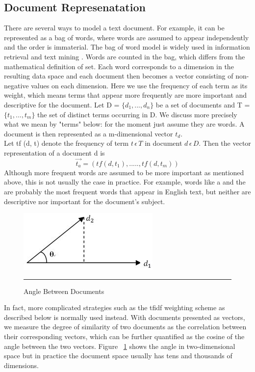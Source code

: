 \subsection{Document Represenatation}
There are several ways to model a text document. For example, it can be represented as a bag of words, where words are assumed to appear independently and the order is immaterial. The bag of word model is widely used in information retrieval and text mining . Words are counted in the bag, which differs from the mathematical definition of set. Each word corresponds to a dimension in the resulting data space and each document then becomes a  vector consisting of non-negative values on each dimension. Here we use the frequency of each term as its weight, which means terms that appear more frequently are more important and descriptive for the document.
Let D = $\{d_1 , . . . , d_n \}$ be a set of documents and T = $\{t_1 , . . . ,t_m \}$ the set of distinct terms occurring in D. We discuss more precisely what we mean by "terms" below: for the moment just assume they are words. A document is then represented as a m-dimensional vector $t_d$.\\
Let tf (d, t) denote the frequency of term $t \,\epsilon\, T$ in document $d \, \epsilon\, D$. Then the vector representation of a document d is
\begin{equation}
\vec{t_{a}} = (tf(d,t_1),.....,tf(d,t_m))
\end{equation}
Although more frequent words are assumed to be more important as mentioned above, this is not usually the case in practice. For example, words like a and the are probably the most frequent words that appear in English text, but neither are descriptive nor important for the document’s subject.
\begin{figure}[htbp]
	\centering
		\includegraphics{./Figures/a.png}
		\rule{35em}{0.5pt}
	\caption[Angle Between Documents]{Angle Between Documents}
	\label{fig:Angle_Between_Documents}
\end{figure}
In fact, more complicated strategies such as the tfidf weighting scheme as described below is normally used instead.
With documents presented as vectors, we measure the degree of similarity of two documents as the correlation between their corresponding vectors, which can be further quantified as the cosine of the angle between the two vectors.
Figure ~\ref{fig:Angle_Between_Documents} shows the angle in two-dimensional space but in practice the document space usually has tens and thousands of dimensions\citep{lexical}.
